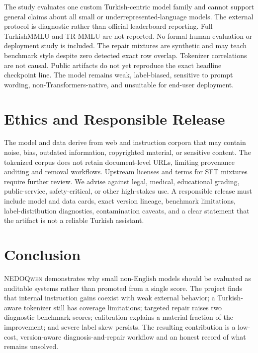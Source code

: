 \documentclass[11pt]{article}
\newcommand{\model}{\textsc{NEDOQwen}}
\begin{document}
The study evaluates one custom Turkish-centric model family and cannot support
general claims about all small or underrepresented-language models. The
external protocol is diagnostic rather than official leaderboard reporting.
Full TurkishMMLU and TR-MMLU are not reported. No formal human evaluation or
deployment study is included. The repair mixtures are synthetic and may teach
benchmark style despite zero detected exact row overlap. Tokenizer correlations
are not causal. Public artifacts do not yet reproduce the exact headline
checkpoint line. The model remains weak, label-biased, sensitive to prompt
wording, non-Transformers-native, and unsuitable for end-user deployment.

\section{Ethics and Responsible Release}

The model and data derive from web and instruction corpora that may contain
noise, bias, outdated information, copyrighted material, or sensitive content.
The tokenized corpus does not retain document-level URLs, limiting provenance
auditing and removal workflows. Upstream licenses and terms for SFT mixtures
require further review. We advise against legal, medical, educational grading,
public-service, safety-critical, or other high-stakes use. A responsible release
must include model and data cards, exact version lineage, benchmark limitations,
label-distribution diagnostics, contamination caveats, and a clear statement
that the artifact is not a reliable Turkish assistant.

\section{Conclusion}

\model{} demonstrates why small non-English models should be evaluated as
auditable systems rather than promoted from a single score. The project finds
that internal instruction gains coexist with weak external behavior; a
Turkish-aware tokenizer still has coverage limitations; targeted repair raises
two diagnostic benchmark scores; calibration explains a material fraction of
the improvement; and severe label skew persists. The resulting contribution
is a low-cost, version-aware diagnosis-and-repair workflow and an honest record
of what remains unsolved.



\end{document}
